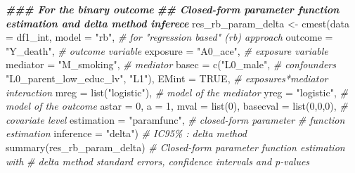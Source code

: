 \documentclass[
]{book}
\newenvironment{Shaded}{\begin{snugshade}}{\end{snugshade}}
\newcommand{\AttributeTok}[1]{\textcolor[rgb]{0.77,0.63,0.00}{#1}}
\newcommand{\CommentTok}[1]{\textcolor[rgb]{0.56,0.35,0.01}{\textit{#1}}}
\newcommand{\ConstantTok}[1]{\textcolor[rgb]{0.00,0.00,0.00}{#1}}
\newcommand{\DecValTok}[1]{\textcolor[rgb]{0.00,0.00,0.81}{#1}}
\newcommand{\DocumentationTok}[1]{\textcolor[rgb]{0.56,0.35,0.01}{\textbf{\textit{#1}}}}
\newcommand{\FunctionTok}[1]{\textcolor[rgb]{0.00,0.00,0.00}{#1}}
\newcommand{\NormalTok}[1]{#1}
\newcommand{\OtherTok}[1]{\textcolor[rgb]{0.56,0.35,0.01}{#1}}
\newcommand{\StringTok}[1]{\textcolor[rgb]{0.31,0.60,0.02}{#1}}
\begin{document}
\begin{Shaded}
\begin{Highlighting}[]
\DocumentationTok{\#\#\# For the binary outcome}
\DocumentationTok{\#\# Closed{-}form parameter function estimation and delta method inferece}
\NormalTok{res\_rb\_param\_delta }\OtherTok{\textless{}{-}} \FunctionTok{cmest}\NormalTok{(}\AttributeTok{data =}\NormalTok{ df1\_int,}
                            \AttributeTok{model =} \StringTok{"rb"}\NormalTok{, }\CommentTok{\# for "regression based" (rb) approach}
                            \AttributeTok{outcome =} \StringTok{"Y\_death"}\NormalTok{,        }\CommentTok{\# outcome variable}
                            \AttributeTok{exposure =} \StringTok{"A0\_ace"}\NormalTok{,      }\CommentTok{\# exposure variable}
                            \AttributeTok{mediator =} \StringTok{"M\_smoking"}\NormalTok{,   }\CommentTok{\# mediator}
                            \AttributeTok{basec =} \FunctionTok{c}\NormalTok{(}\StringTok{"L0\_male"}\NormalTok{,      }\CommentTok{\# confounders}
                                      \StringTok{"L0\_parent\_low\_educ\_lv"}\NormalTok{,}
                                      \StringTok{"L1"}\NormalTok{),}
                            \AttributeTok{EMint =} \ConstantTok{TRUE}\NormalTok{, }\CommentTok{\# exposures*mediator interaction}
                            \AttributeTok{mreg =} \FunctionTok{list}\NormalTok{(}\StringTok{"logistic"}\NormalTok{), }\CommentTok{\# model of the mediator}
                            \AttributeTok{yreg =} \StringTok{"logistic"}\NormalTok{,       }\CommentTok{\# model of the outcome}
                            \AttributeTok{astar =} \DecValTok{0}\NormalTok{,}
                            \AttributeTok{a =} \DecValTok{1}\NormalTok{,}
                            \AttributeTok{mval =} \FunctionTok{list}\NormalTok{(}\DecValTok{0}\NormalTok{),}
                            \AttributeTok{basecval =} \FunctionTok{list}\NormalTok{(}\DecValTok{0}\NormalTok{,}\DecValTok{0}\NormalTok{,}\DecValTok{0}\NormalTok{),      }\CommentTok{\# covariate level}
                            \AttributeTok{estimation =} \StringTok{"paramfunc"}\NormalTok{, }\CommentTok{\#  closed{-}form parameter}
                            \CommentTok{\# function estimation}
                            \AttributeTok{inference =} \StringTok{"delta"}\NormalTok{) }\CommentTok{\# IC95\% : delta method}
\FunctionTok{summary}\NormalTok{(res\_rb\_param\_delta)}
\CommentTok{\# Closed{-}form parameter function estimation with}
\CommentTok{\# delta method standard errors, confidence intervals and p{-}values}

\end{Highlighting}
\end{Shaded}
\end{document}
